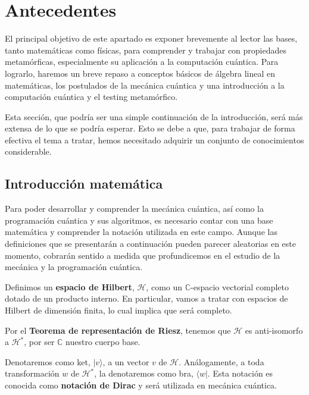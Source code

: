 \cleardoublepage

\chapter{Antecedentes}
\label{Cap2:Antecedentes}

El principal objetivo de este apartado es exponer brevemente al lector las bases, tanto matemáticas como físicas, para comprender y trabajar con propiedades metamórficas, especialmente su aplicación a la computación cuántica. Para lograrlo, haremos un breve repaso a conceptos básicos de álgebra lineal en matemáticas, los postulados de la mecánica cuántica y una introducción a la computación cuántica y el testing metamórfico. 

\vspace{5pt}
Esta sección, que podría ser una simple continuación de la introducción, será más extensa de lo que se podría esperar. Esto se debe a que, para trabajar de forma efectiva el tema a tratar, hemos necesitado adquirir un conjunto de conocimientos considerable.

\section{Introducción matemática}
\label{Sec2.1:Matematicas}
Para poder desarrollar y comprender la mecánica cuántica, así como la programación cuántica y sus algoritmos, es necesario contar con una base matemática y comprender la notación utilizada en este campo. Aunque las definiciones que se presentarán a continuación pueden parecer aleatorias en este momento, cobrarán sentido a medida que profundicemos en el estudio de la mecánica y la programación cuántica.

\vspace{5pt}

Definimos un \textbf{espacio de Hilbert}, $\mathscr{H}$, como un $\mathbb{C}$-espacio vectorial completo dotado de un producto interno. En particular, vamos a tratar con espacios de Hilbert de dimensión finita, lo cual implica que será completo.

\vspace{5pt}

Por el \textbf{Teorema de representación de Riesz}, tenemos que $\mathscr{H}$ es anti-isomorfo a $\mathscr{H}^{*}$, por ser $\mathbb{C}$ nuestro cuerpo base.

\vspace{5pt}

Denotaremos como ket, $|v\rangle$, a un vector $v$ de $\mathscr{H}$. Análogamente, a toda transformación $w$ de $\mathscr{H}^{*}$, la denotaremos como bra, $\langle w|$. Esta notación es conocida como \textbf{notación de Dirac} y será utilizada en mecánica cuántica.

